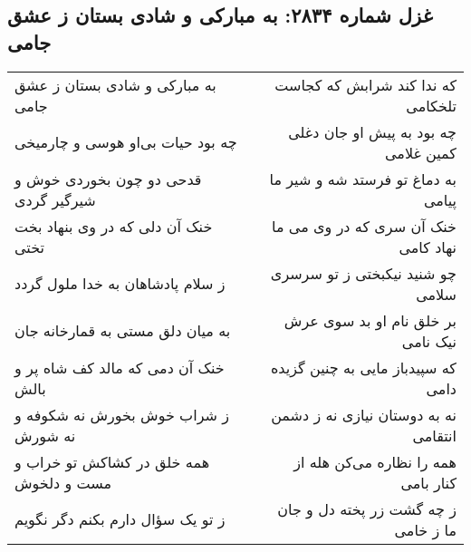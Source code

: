 \begin{center}
\section*{غزل شماره ۲۸۳۴: به مبارکی و شادی بستان ز عشق جامی}
\label{sec:2834}
\begin{longtable}{l p{0.5cm} r}
به مبارکی و شادی بستان ز عشق جامی
&&
که ندا کند شرابش که کجاست تلخکامی
\\
چه بود حیات بی‌او هوسی و چارمیخی
&&
چه بود به پیش او جان دغلی کمین غلامی
\\
قدحی دو چون بخوردی خوش و شیرگیر گردی
&&
به دماغ تو فرستد شه و شیر ما پیامی
\\
خنک آن دلی که در وی بنهاد بخت تختی
&&
خنک آن سری که در وی می ما نهاد کامی
\\
ز سلام پادشاهان به خدا ملول گردد
&&
چو شنید نیکبختی ز تو سرسری سلامی
\\
به میان دلق مستی به قمارخانه جان
&&
بر خلق نام او بد سوی عرش نیک نامی
\\
خنک آن دمی که مالد کف شاه پر و بالش
&&
که سپیدباز مایی به چنین گزیده دامی
\\
ز شراب خوش بخورش نه شکوفه و نه شورش
&&
نه به دوستان نیازی نه ز دشمن انتقامی
\\
همه خلق در کشاکش تو خراب و مست و دلخوش
&&
همه را نظاره می‌کن هله از کنار بامی
\\
ز تو یک سؤال دارم بکنم دگر نگویم
&&
ز چه گشت زر پخته دل و جان ما ز خامی
\\
\end{longtable}
\end{center}
